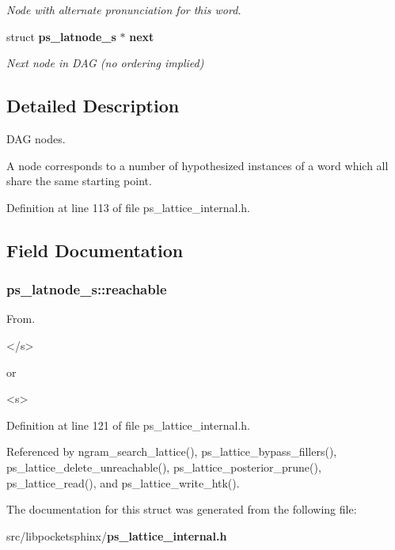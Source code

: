\begin{DoxyCompactItemize}
\begin{DoxyCompactList}\small\item\em \-Node with alternate pronunciation for this word. \end{DoxyCompactList}\item 
struct {\bf ps\-\_\-latnode\-\_\-s} $\ast$ {\bf next}\label{structps__latnode__s_aca6f3d543a1712a1ca3bb8ec60f71c84}

\begin{DoxyCompactList}\small\item\em \-Next node in \-D\-A\-G (no ordering implied) \end{DoxyCompactList}\end{DoxyCompactItemize}


\subsection{\-Detailed \-Description}
\-D\-A\-G nodes. 

\-A node corresponds to a number of hypothesized instances of a word which all share the same starting point. 

\-Definition at line 113 of file ps\-\_\-lattice\-\_\-internal.\-h.



\subsection{\-Field \-Documentation}
\subsubsection[{reachable}]{ {\bf ps\-\_\-latnode\-\_\-s\-::reachable}}\label{structps__latnode__s_af9c4c69f5f85bbc36818357a52432565}


\-From. 

\begin{DoxyVerb}</s> \end{DoxyVerb}
 or \begin{DoxyVerb}<s> \end{DoxyVerb}
 

\-Definition at line 121 of file ps\-\_\-lattice\-\_\-internal.\-h.



\-Referenced by ngram\-\_\-search\-\_\-lattice(), ps\-\_\-lattice\-\_\-bypass\-\_\-fillers(), ps\-\_\-lattice\-\_\-delete\-\_\-unreachable(), ps\-\_\-lattice\-\_\-posterior\-\_\-prune(), ps\-\_\-lattice\-\_\-read(), and ps\-\_\-lattice\-\_\-write\-\_\-htk().



\-The documentation for this struct was generated from the following file\-:\begin{DoxyCompactItemize}
\item 
src/libpocketsphinx/{\bf ps\-\_\-lattice\-\_\-internal.\-h}\end{DoxyCompactItemize}
